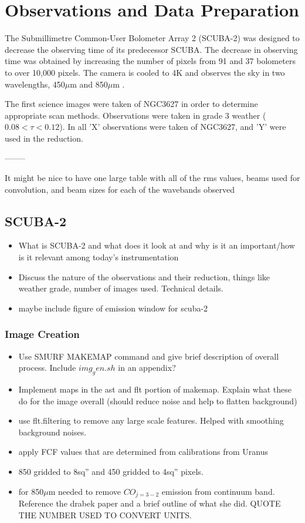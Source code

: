\chapter{Observations and Data Preparation}\label{observations}

The Submillimetre Common-User Bolometer Array 2 (SCUBA-2) was designed to decrease the observing time of its predecessor SCUBA.  The decrease in observing time was obtained by increasing the number of pixels from 91 and 37 bolometers to over 10,000 pixels.  The camera is cooled to 4K and observes the sky in two wavelengths, 450$\mu$m and 850$\mu$m \citet{holland2013}.

The first science images were taken of NGC3627 in order to determine appropriate scan methods.  Observations were taken in grade 3 weather ($0.08<\tau<0.12$).  In all 'X' observations were taken of NGC3627, and 'Y' were used in the reduction.


--------

It might be nice to have one large table with all of the rms values, beams used for convolution, and beam sizes for each of the wavebands observed

\section{SCUBA-2}
\begin{itemize}
   \item What is SCUBA-2 and what does it look at and why is it an important/how is it relevant among today's instrumentation
   \item Discuss the nature of the observations and their reduction, things like weather grade, number of images used.  Technical details.
   \item maybe include figure of emission window for scuba-2
\end{itemize}

\subsection{Image Creation}
\begin{itemize}
   \item Use SMURF MAKEMAP command and give brief description of overall process.  Include $img_gen.sh$ in an appendix?
   \item Implement maps in the ast and flt portion of makemap.  Explain what these do for the image overall (should reduce noise and help to flatten background)
   \item use flt.filtering to remove any large scale features.  Helped with smoothing background noises.
   \item apply FCF values that are determined from calibrations from Uranus
   \item 850 gridded to 8sq'' and 450 gridded to 4sq'' pixels.
   \item for 850$\mu$m needed to remove $CO_{j=3-2}$ emission from continuum band.  Reference the drabek paper and a brief outline of what she did.  QUOTE THE NUMBER USED TO CONVERT UNITS.
\end{itemize}

